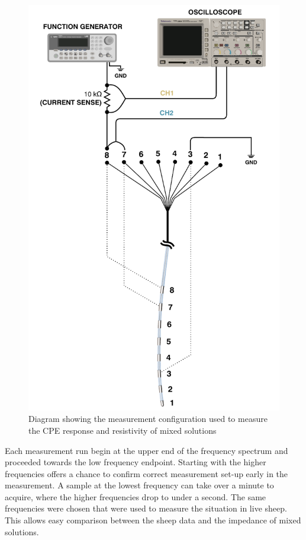   \begin{figure}
      \centering
      \includegraphics[scale=0.95]{content/pt2/graphics/CreatingCSF_setup}
      \caption{\label{fig:creatingCSF_setup}Diagram showing the measurement configuration used to measure the CPE response and resistivity of mixed solutions}
  \end{figure}

  Each measurement run begin at the upper end of the frequency spectrum and proceeded towards the low frequency endpoint.
  Starting with the higher frequencies offers a chance to confirm correct measurement set-up early in the measurement.
  A sample at the lowest frequency can take over a minute to acquire, where the higher frequencies drop to under a second.
  The same frequencies were chosen that were used to measure the situation in live sheep.
  This allows easy comparison between the sheep data and the impedance of mixed solutions.

